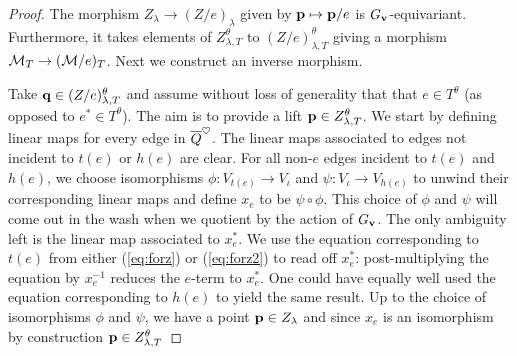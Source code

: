\documentclass{amsart}
\theoremstyle{definition}
\begin{document}
\begin{proof}
The morphism $Z_\lambda \rightarrow (Z/e)_\lambda$ given by $\mathbf{p} \mapsto \mathbf{p}/e$ is $G_{\mathbf{v}}$-equivariant.
Furthermore, it takes elements of $Z_{\lambda,T}^\theta$ to $(Z/e)_{\lambda,T}^\theta$  giving a morphism $\mathcal{M}_T \rightarrow (\mathcal{M}/e)_T$. 
Next we construct an inverse morphism.

Take $\mathbf{q} \in (Z/e)_{\lambda,T}^\theta$ and assume without loss of generality that that $e \in T^\theta$ (as opposed to $e^* \in T^\theta$). 
The aim is to provide a lift $\mathbf{p} \in Z_{\lambda,T}^\theta$.
We start by defining linear maps for every edge in ${\overline{Q}}^\heartsuit$.
The linear maps associated to edges not incident to $t(e)$ or $h(e)$ are clear.
For all non-$e$ edges incident to $t(e)$ and $h(e)$, we choose isomorphisms $\phi \colon V_{t(e)} \rightarrow V_\iota$ and $\psi \colon V_\iota \rightarrow V_{h(e)}$ to unwind their corresponding linear maps and define $x_e$ to be $\psi \circ \phi$.
This choice of $\phi$ and $\psi$ will come out in the wash when we quotient by the action of $G_{\mathbf{v}}$.
The only ambiguity left is the linear map associated to $x_e^*$.
We use the equation corresponding to $t(e)$ from either (\ref{eq:forz}) or (\ref{eq:forz2}) to read off $x_e^*$: post-multiplying the equation by $x_e^{-1}$ reduces the $e$-term to $x_e^*$.
One could have equally well used the equation corresponding to $h(e)$ to yield the same result.
Up to the choice of isomorphisms $\phi$ and $\psi$, we have a point $\mathbf{p} \in Z_\lambda$ and since $x_e$ is an isomorphism by construction $\mathbf{p} \in Z_{\lambda,T}^\theta$



\end{proof}
\end{document}

